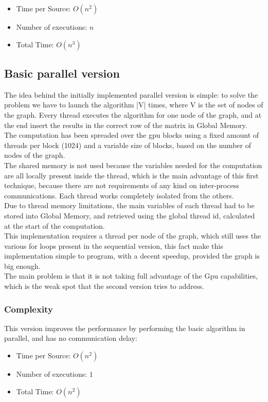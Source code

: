 \documentclass[
	a4paper, %
	12pt, %
]{class}
\begin{document}
\begin{itemize}
    \item Time per Source: $O(n^2)$
    \item Number of executions: $n$
    \item Total Time: $O(n^3)$\\
\end{itemize}

\subsection{Basic parallel version}
The idea behind the initially implemented parallel version is simple:
to solve the problem we have to launch the algorithm |V| times, where V is the set of nodes of the graph.
Every thread executes the algorithm for one node of the graph, and at the end insert the results in the correct
row of the matrix in Global Memory.\\

The computation has been spreaded over the gpu blocks using a fixed amount of threads per block (1024) and
a variable size of blocks, based on the number of nodes of the graph. \\

The shared memory is not used because the variables needed for the computation are all locally present inside the thread, which is the main advantage of
this first technique, because there are not requirements of any kind on inter-process communications. Each thread works completely isolated from the others.\\

Due to thread memory limitations, the main variables of each thread had to be stored into Global Memory, and retrieved using the global thread id, calculated
at the start of the computation.\\

This implementation requires a thread per node of the graph, which still uses the various for loops present in the sequential version,
this fact make this implementation simple to program, with a decent speedup, provided the graph is big enough.\\
The main problem is that it is not taking full advantage of the Gpu capabilities, which is the weak spot that the second version tries to address.

\subsubsection{Complexity}
This version improves the performance by performing the basic algorithm in parallel, and has no communication delay:\\
\begin{itemize}
    \item Time per Source: $O(n^2)$
    \item Number of executions: $1$
    \item Total Time: $O(n^2)$\\
\end{itemize}
\end{document}
